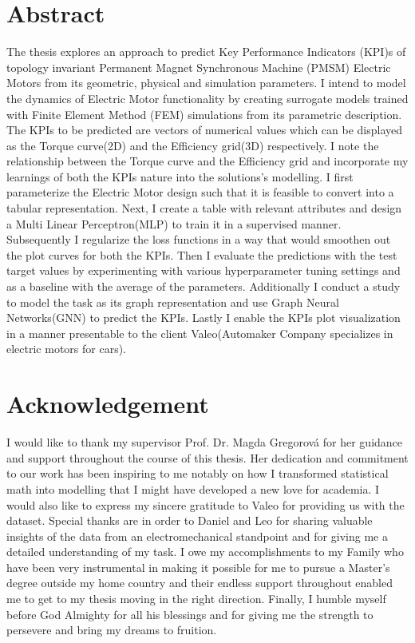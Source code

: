 \documentclass{report} %
\begin{document}
\chapter*{Abstract}

The thesis explores an approach to predict Key Performance Indicators (KPI)s of topology invariant Permanent Magnet Synchronous Machine
(PMSM) Electric Motors from its geometric, physical and simulation parameters.
I intend to model the dynamics of Electric Motor functionality by creating surrogate models trained with Finite Element Method (FEM) simulations from its parametric description.
The KPIs to be predicted are vectors of numerical values which can be displayed as the Torque curve(2D) and the Efficiency grid(3D) respectively.
I note the relationship between the Torque curve and the Efficiency grid and incorporate my learnings of both the KPIs nature into the solutions's modelling.
I first parameterize the Electric Motor design such that it is feasible to convert into a tabular representation.
Next, I create a table with relevant attributes and design a Multi Linear Perceptron(MLP) to train it in a supervised manner.
Subsequently I regularize the loss functions in a way that would smoothen out the plot curves for both the KPIs.
Then I evaluate the predictions with the test target values by experimenting with various hyperparameter tuning settings 
and as a baseline with the average of the parameters.
Additionally I conduct a study to model the task as its graph representation and use Graph Neural Networks(GNN) to predict the KPIs.
Lastly I enable the KPIs plot visualization in a manner presentable to the client Valeo(Automaker Company specializes in  electric motors for cars).

\chapter*{Acknowledgement}
I would like to thank my supervisor Prof. Dr. Magda Gregorová for her guidance and support throughout the course of this thesis.
Her dedication and commitment to our work has been inspiring to me notably on how I transformed statistical math into modelling that I might have developed a 
new love for academia. I would also like to express my sincere gratitude to Valeo for providing us with the dataset.
Special thanks are in order to Daniel and Leo for sharing valuable insights of the data from an electromechanical standpoint and for giving me a detailed understanding 
of my task. I owe my accomplishments to my Family who have been very instrumental in making it possible for me to pursue a Master's degree outside my home country 
and their endless support throughout enabled me to get to my thesis moving in the right direction. Finally, I humble myself before God Almighty for all his blessings 
and for giving me the strength to persevere and bring my dreams to fruition.
\end{document}
